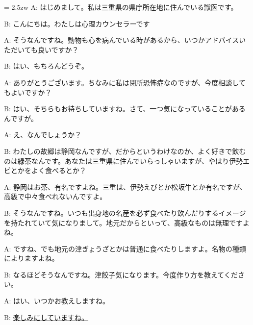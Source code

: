 \documentclass[11pt]{amsart}
\title{}
\author{}
\newenvironment{hangall}[1]{\hangindent = 2.5zw\everypar{\hangindent = 2.5zw}}{}
\begin{document}
\maketitle
\begin{hangall}{}%
A: はじめまして。私は三重県の県庁所在地に住んでいる獣医です。

B: こんにちは。わたしは心理カウンセラーです

A: そうなんですね。動物も心を病んでいる時があるから、いつかアドバイスいただいても良いですか？

B: はい、もちろんどうぞ。

A: ありがとうございます。ちなみに私は閉所恐怖症なのですが、今度相談してもよいですか？

B: はい、そちらもお待ちしていますね。さて、一つ気になっていることがあるんですが。

A: え、なんでしょうか？

B: わたしの故郷は静岡なんですが、だからというわけなのか、よく好きで飲むのは緑茶なんです。あなたは三重県に住んでいらっしゃいますが、やはり伊勢エビとかをよく食べるとか？

A: 静岡はお茶、有名ですよね。三重は、伊勢えびとか松坂牛とか有名ですが、高級で中々食べれないんですよ。

B: そうなんですね。いつも出身地の名産を必ず食べたり飲んだりするイメージを持たれていて気になりまして。地元だからといって、高級なものは無理ですよね。

A: ですね、でも地元の津ぎょうざとかは普通に食べたりしますよ。名物の種類によりますよね。

B: なるほどそうなんですね。津餃子気になります。今度作り方を教えてください。

A: はい、いつかお教えしますね。

B: \ul{楽しみにしていますね。}\end{hangall}
\end{document}
